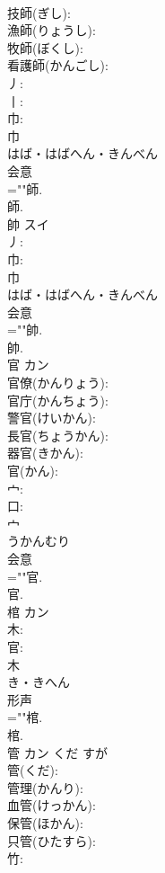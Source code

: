 \documentclass[8pt]{extreport}
\begin{document}
\begin{CJK}{UTF8}{min}
\\	技師(ぎし): 
\\	漁師(りょうし): 
\\	牧師(ぼくし): 
\\	看護師(かんごし): 
\\	丿: 
\\	丨: 
\\	巾: 
\\	巾	
\\	はば・はばへん・きんべん	
\\	会意 
\\	=""師.
\\	師.
\\	帥	スイ			
\\	丿: 
\\	巾: 
\\	巾	
\\	はば・はばへん・きんべん	
\\	会意 
\\	=""帥.
\\	帥.
\\	官	カン			
\\	官僚(かんりょう): 
\\	官庁(かんちょう): 
\\	警官(けいかん): 
\\	長官(ちょうかん): 
\\	器官(きかん): 
\\	官(かん): 
\\	宀: 
\\	口: 
\\	宀	
\\	うかんむり	
\\	会意 
\\	=""官.
\\	官.
\\	棺	カン			
\\	木: 
\\	官: 
\\	木	
\\	き・きへん	
\\	形声 
\\	=""棺.
\\	棺.
\\	管	カン	くだ	すが	
\\	管(くだ): 
\\	管理(かんり): 
\\	血管(けっかん): 
\\	保管(ほかん): 
\\	只管(ひたすら): 
\\	竹: 

\end{CJK}
\end{document}
